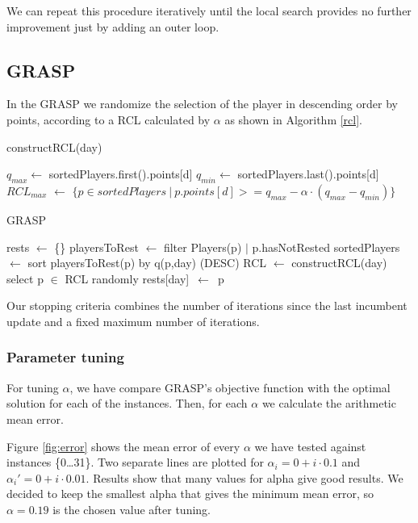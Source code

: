 \documentclass[a4paper, 10pt]{article}
\begin{document}
We can repeat this procedure iteratively until the local search provides no further improvement just by adding an outer loop.


\clearpage
\subsection{GRASP}

In the GRASP we randomize the selection of the player in descending order by points, according to a RCL calculated by $\alpha$ as shown in Algorithm \ref{rcl}.


\begin{algorithm}
    \caption{constructRCL(day)} 
    \label{rcl}
    \begin{algorithmic}[1]
	\State $q_{max} \leftarrow $ sortedPlayers.first().points[d]
	\State $q_{min} \leftarrow$ sortedPlayers.last().points[d]
	\State $RCL_{max}$ $\leftarrow$ $\{p \in sortedPlayers\ |\ p.points[d] >= q_{max} - \alpha \cdot (q_{max} - q_{min})\}$
    \end{algorithmic} 
\end{algorithm}




\begin{algorithm}
	\caption{GRASP} 
	\begin{algorithmic}[1]
	  \State rests $\leftarrow$ \{\}
        \State playersToRest $\leftarrow$ filter Players(p) $|$ p.hasNotRested
        \State sortedPlayers $\leftarrow$ sort playersToRest(p) by q(p,day) (DESC)
	      \State RCL $\leftarrow$ constructRCL(day)
	      \State select p $\in$ RCL randomly
	      \State rests[day]\ $\leftarrow$\ p
	    \EndFor
	\end{algorithmic} 
\end{algorithm}

Our stopping criteria combines the number of iterations since the last incumbent update and a fixed maximum number of iterations.


\subsubsection{Parameter tuning} 

For tuning $\alpha$, we have compare GRASP's objective function with the optimal solution for each of the instances. Then, for each $\alpha$ we calculate the arithmetic mean error. 

Figure \ref{fig:error} shows the mean error of every $\alpha$ we have tested against instances \{0\dots31\}. Two separate lines are plotted for $\alpha_i = 0 + i \cdot 0.1$ and $\alpha_i' = 0 + i \cdot 0.01$. Results show that many values for alpha give good results. We decided to keep the smallest alpha that gives the minimum mean error, so $\alpha = 0.19$ is the chosen value after tuning.
\end{document}
